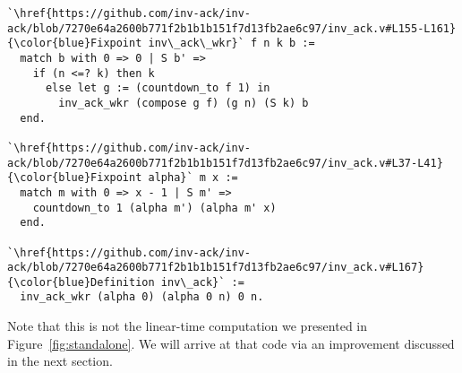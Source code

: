 %
%
\begin{lstlisting}
`\href{https://github.com/inv-ack/inv-ack/blob/7270e64a2600b771f2b1b1b151f7d13fb2ae6c97/inv_ack.v#L155-L161} {\color{blue}Fixpoint inv\_ack\_wkr}` f n k b :=
  match b with 0 => 0 | S b' =>
    if (n <=? k) then k
      else let g := (countdown_to f 1) in
        inv_ack_wkr (compose g f) (g n) (S k) b
  end.

`\href{https://github.com/inv-ack/inv-ack/blob/7270e64a2600b771f2b1b1b151f7d13fb2ae6c97/inv_ack.v#L37-L41}{\color{blue}Fixpoint alpha}` m x :=
  match m with 0 => x - 1 | S m' =>
    countdown_to 1 (alpha m') (alpha m' x)
  end.

`\href{https://github.com/inv-ack/inv-ack/blob/7270e64a2600b771f2b1b1b151f7d13fb2ae6c97/inv_ack.v#L167}{\color{blue}Definition inv\_ack}` :=
  inv_ack_wkr (alpha 0) (alpha 0 n) 0 n.
\end{lstlisting}

\noindent Note that this is not the linear-time computation we presented in
Figure~\ref{fig:standalone}. We will arrive at that code via an improvement discussed in the next section.


